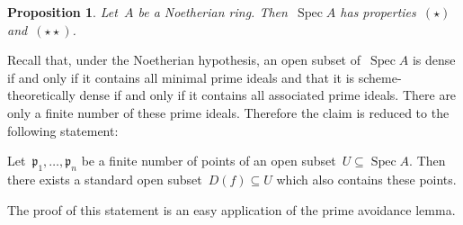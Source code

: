\documentclass[10pt,reqno,a4paper]{amsbook}
\makeatletter
\theoremstyle{definition}
\theoremstyle{plain}
\newtheorem{prop}[defn]{Proposition}
\theoremstyle{remark}
\newcommand{\ppp}{\mathfrak{p}}
\DeclareMathOperator{\Spec}{Spec}
\newcommand{\?}{\,{:}\,}
\renewcommand{\_}{\mathpunct{.}\,}
\renewenvironment{proof}[1][\proofname]{\par
  \pushQED{\qed}%
  \normalfont \topsep6\p@\@plus6\p@\relax
  \trivlist
  \item[\hskip\labelsep
        \itshape
    #1\@addpunct{.}]\ignorespaces
}{%
  \popQED\endtrivlist\@endpefalse
}
\makeatother
\begin{document}
\begin{prop}Let~$A$ be a Noetherian ring. Then~$\Spec A$ has properties~$(\star)$
and~$(\star\star)$.
\end{prop}
\begin{proof}Recall that, under the Noetherian hypothesis, an open subset of~$\Spec A$ is dense if and only if it
contains all minimal prime ideals and that it
is scheme-theoretically dense if and only if it contains all associated prime
ideals. There are only a finite number of these prime ideals. Therefore the
claim is reduced to the following statement:

Let~$\ppp_1,\ldots,\ppp_n$ be a
finite number of points of an open subset~$U \subseteq \Spec A$. Then there
exists a standard open subset~$D(f) \subseteq U$ which also contains these
points.

The proof of this statement is an easy application of the prime
avoidance lemma.
\end{proof}
\end{document}
